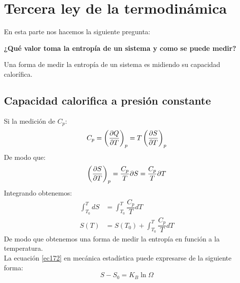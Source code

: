 \documentclass[../main]{subfiles}
\begin{document}
\chapter{Tercera ley de la termodinámica}
En esta parte nos hacemos la siguiente pregunta: \\
\begin{center}
  \textbf{¿Qué valor toma la entropía de un sistema y como se puede medir?}  
\end{center}
Una forma de medir la entropía de un sistema es midiendo su capacidad calorífica. 
\section{Capacidad calorifica a presión constante}
Si la medición de $C_p$:
\begin{equation}
    C_p=\left( \pdv{Q}{T}\right)_p=T\left( \pdv{S}{T}\right)_p
\end{equation}
De modo que:
\begin{equation}
    \left( \pdv{S}{T}\right)_p= \dfrac{C_p}{T} \\
    \partial S= \dfrac{C_p}{T}\partial T
\end{equation}
Integrando obtenemos:
\begin{align}
    \int_{T_0}^{T}dS&=\int_{T_0}^T \dfrac{C_p}{T}dT \\
    S(T)&=S(T_0)+\int_{T_0}^T \dfrac{C_p}{T}dT
    \label{ec172}
\end{align}
De modo que obtenemos una forma de medir la entropía en función a la temperatura. \\[0.3cm]
La ecuación \eqref{ec172} en mecánica estadística puede expresarse de la siguiente forma:
\begin{equation}
    S-S_0=K_B \ln{\Omega}
\end{equation}
\end{document}
